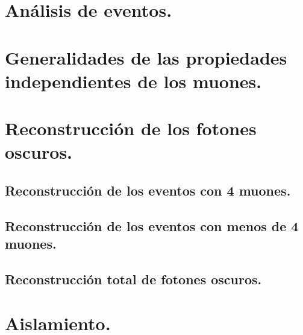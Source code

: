 \documentclass[12pt]{report}
\begin{document}
	\section{Análisis de eventos.}
    
    
    \section{Generalidades de las propiedades independientes de los muones.}
    
    
	\section{Reconstrucción de los fotones oscuros.}
	
		\subsection{Reconstrucción de los eventos con 4 muones.}
		
		
		\subsection{Reconstrucción de los eventos con menos de 4 muones.}	
		
		
		\subsection{Reconstrucción total de fotones oscuros.}	
		

    
    \section{Aislamiento.}
    

    


\end{document}
